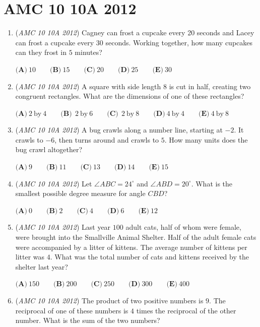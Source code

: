 \section{AMC 10 10A 2012}
        \begin{enumerate}
        	\item (\textit{AMC 10 10A 2012}) Cagney can frost a cupcake every 20 seconds and Lacey can frost a cupcake every $30$ seconds. Working together, how many cupcakes can they frost in $5$ minutes?


 $\textbf{(A)}\ 10\qquad\textbf{(B)}\ 15\qquad\textbf{(C)}\ 20\qquad\textbf{(D)}\ 25\qquad\textbf{(E)}\ 30$


	\item (\textit{AMC 10 10A 2012}) A square with side length $8$ is cut in half, creating two congruent rectangles. What are the dimensions of one of these rectangles?


 $\textbf{(A)}\ 2\ \text{by}\ 4\qquad\textbf{(B)}\ \ 2\ \text{by}\ 6\qquad\textbf{(C)}\ \ 2\ \text{by}\ 8\qquad\textbf{(D)}\ 4\ \text{by}\ 4\qquad\textbf{(E)}\ 4\ \text{by}\ 8$


	\item (\textit{AMC 10 10A 2012}) A bug crawls along a number line, starting at $-2$. It crawls to $-6$, then turns around and crawls to $5$. How many units does the bug crawl altogether?


 $\textbf{(A)}\ 9\qquad\textbf{(B)}\ 11\qquad\textbf{(C)}\ 13\qquad\textbf{(D)}\ 14\qquad\textbf{(E)}\ 15$


	\item (\textit{AMC 10 10A 2012}) Let $\angle ABC = 24^\circ$ and $\angle ABD = 20^\circ$. What is the smallest possible degree measure for angle $CBD$?


 $\textbf{(A)}\ 0\qquad\textbf{(B)}\ 2\qquad\textbf{(C)}\ 4\qquad\textbf{(D)}\ 6\qquad\textbf{(E)}\ 12$


	\item (\textit{AMC 10 10A 2012}) Last year $100$ adult cats, half of whom were female, were brought into the Smallville Animal Shelter. Half of the adult female cats were accompanied by a litter of kittens. The average number of kittens per litter was $4$. What was the total number of cats and kittens received by the shelter last year?


 $\textbf{(A)}\ 150\qquad\textbf{(B)}\ 200\qquad\textbf{(C)}\ 250\qquad\textbf{(D)}\ 300\qquad\textbf{(E)}\ 400$


	\item (\textit{AMC 10 10A 2012}) The product of two positive numbers is $9$. The reciprocal of one of these numbers is $4$ times the reciprocal of the other number. What is the sum of the two numbers?



\end{enumerate}
